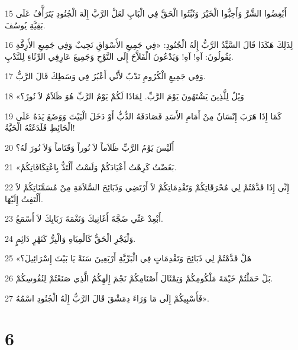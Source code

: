 \par 15 أَبْغِضُوا الشَّرَّ وَأَحِبُّوا الْخَيْرَ وَثَبِّتُوا الْحَقَّ فِي الْبَابِ لَعَلَّ الرَّبَّ إِلَهَ الْجُنُودِ يَتَرَأَّفُ عَلَى بَقِيَّةِ يُوسُفَ.
\par 16 لِذَلِكَ هَكَذَا قَالَ السَّيِّدُ الرَّبُّ إِلَهُ الْجُنُودِ: «فِي جَمِيعِ الأَسْوَاقِ نَحِيبٌ وَفِي جَمِيعِ الأَزِقَّةِ يَقُولُونَ: آهِ! آهِ! وَيَدْعُونَ الْفَلاَّحَ إِلَى النَّوْحِ وَجَمِيعَ عَارِفِي الرِّثَاءِ لِلنَّدْبِ.
\par 17 وَفِي جَمِيعِ الْكُرُومِ نَدْبٌ لأَنِّي أَعْبُرُ فِي وَسَطِكَ قَالَ الرَّبُّ.
\par 18 «وَيْلٌ لِلَّذِينَ يَشْتَهُونَ يَوْمَ الرَّبِّ. لِمَاذَا لَكُمْ يَوْمُ الرَّبِّ هُوَ ظَلاَمٌ لاَ نُورٌ؟
\par 19 كَمَا إِذَا هَرَبَ إِنْسَانٌ مِنْ أَمَامِ الأَسَدِ فَصَادَفَهُ الدُّبُّ أَوْ دَخَلَ الْبَيْتَ وَوَضَعَ يَدَهُ عَلَى الْحَائِطِ فَلَدَغَتْهُ الْحَيَّةُ!
\par 20 أَلَيْسَ يَوْمُ الرَّبِّ ظَلاَماً لاَ نُوراً وَقَتَاماً وَلاَ نُورَ لَهُ؟
\par 21 «بَغَضْتُ كَرِهْتُ أَعْيَادَكُمْ وَلَسْتُ أَلْتَذُّ بِاعْتِكَافَاتِكُمْ.
\par 22 إِنِّي إِذَا قَدَّمْتُمْ لِي مُحْرَقَاتِكُمْ وَتَقْدِمَاتِكُمْ لاَ أَرْتَضِي وَذَبَائِحَ السَّلاَمَةِ مِنْ مُسَمَّنَاتِكُمْ لاَ أَلْتَفِتُ إِلَيْهَا.
\par 23 أَبْعِدْ عَنِّي ضَجَّةَ أَغَانِيكَ وَنَغْمَةَ رَبَابِكَ لاَ أَسْمَعُ.
\par 24 وَلْيَجْرِ الْحَقُّ كَالْمِيَاهِ وَالْبِرُّ كَنَهْرٍ دَائِمٍ.
\par 25 «هَلْ قَدَّمْتُمْ لِي ذَبَائِحَ وَتَقْدِمَاتٍ فِي الْبَرِّيَّةِ أَرْبَعِينَ سَنَةً يَا بَيْتَ إِسْرَائِيلَ؟
\par 26 بَلْ حَمَلْتُمْ خَيْمَةَ مَلْكُومِكُمْ وَتِمْثَالَ أَصْنَامِكُمْ نَجْمَ إِلَهِكُمُ الَّذِي صَنَعْتُمْ لِنُفُوسِكُمْ.
\par 27 فَأَسْبِيكُمْ إِلَى مَا وَرَاءَ دِمَشْقَ قَالَ الرَّبُّ إِلَهُ الْجُنُودِ اسْمُهُ».

\chapter{6}

